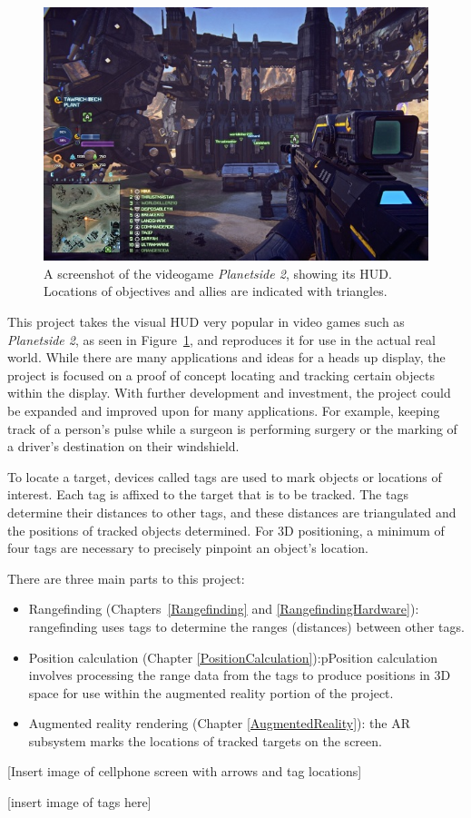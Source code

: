 \begin{figure}
	\centering
	\includegraphics[width=\linewidth]{Figures/GameHUD.jpg}
	\decoRule
	\caption{A screenshot of the videogame \emph{Planetside 2}, showing its HUD. Locations of objectives and allies are indicated with triangles.}
	\label{fig:GameHUD}
\end{figure}

This project takes the visual HUD very popular in video games such as \emph{Planetside 2}, as seen in Figure~\ref{fig:GameHUD}, and reproduces it for use in the actual real world.  While there are many applications and ideas for a heads up display, the project is focused on a proof of concept locating and tracking certain objects within the display. With further development and investment, the project could be expanded and improved upon for many applications. For example, keeping track of a person’s pulse while a surgeon is performing surgery or the marking of a driver's destination on their windshield.

To locate a target, devices called tags are used to mark objects or locations of interest. Each tag is affixed to the target that is to be tracked. The tags determine their distances to other tags, and these distances are triangulated and the positions of tracked objects determined. For 3D positioning, a minimum of four tags are necessary to precisely pinpoint an object's location.

There are three main parts to this project: 
\begin{itemize}
	\item Rangefinding (Chapters~\ref{Rangefinding} and \ref{RangefindingHardware}): rangefinding uses tags to determine the ranges (distances) between other tags.
	\item Position calculation (Chapter \ref{PositionCalculation}):pPosition calculation involves processing the range data from the tags to produce positions in 3D space for use within the augmented reality portion of the project.
	\item Augmented reality rendering (Chapter \ref{AugmentedReality}): the AR subsystem marks the locations of tracked targets on the screen.
\end{itemize}

[Insert image of cellphone screen with arrows and tag locations]

[insert image of tags here]
